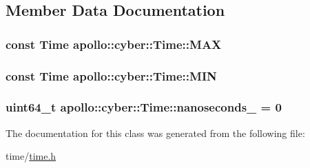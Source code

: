 \subsection{Member Data Documentation}
\hypertarget{classapollo_1_1cyber_1_1Time_a4e28a6f1efbcc5b08154423e6ce88514}{
\subsubsection[{M\-A\-X}]{\setlength{\rightskip}{0pt plus 5cm}const {\bf Time} apollo\-::cyber\-::\-Time\-::\-M\-A\-X\hspace{0.3cm}{\ttfamily [static]}}}\label{classapollo_1_1cyber_1_1Time_a4e28a6f1efbcc5b08154423e6ce88514}
\hypertarget{classapollo_1_1cyber_1_1Time_aa84c8bb7deb9dc66d7b2386dae6fbc1b}{
\subsubsection[{M\-I\-N}]{\setlength{\rightskip}{0pt plus 5cm}const {\bf Time} apollo\-::cyber\-::\-Time\-::\-M\-I\-N\hspace{0.3cm}{\ttfamily [static]}}}\label{classapollo_1_1cyber_1_1Time_aa84c8bb7deb9dc66d7b2386dae6fbc1b}
\hypertarget{classapollo_1_1cyber_1_1Time_a04a6ad56a17f2b1bb2958d9ee9f32552}{
\subsubsection[{nanoseconds\-\_\-}]{\setlength{\rightskip}{0pt plus 5cm}uint64\-\_\-t apollo\-::cyber\-::\-Time\-::nanoseconds\-\_\- = 0\hspace{0.3cm}{\ttfamily [private]}}}\label{classapollo_1_1cyber_1_1Time_a04a6ad56a17f2b1bb2958d9ee9f32552}


The documentation for this class was generated from the following file\-:\begin{DoxyCompactItemize}
\item 
time/\hyperlink{time_8h}{time.\-h}\end{DoxyCompactItemize}
